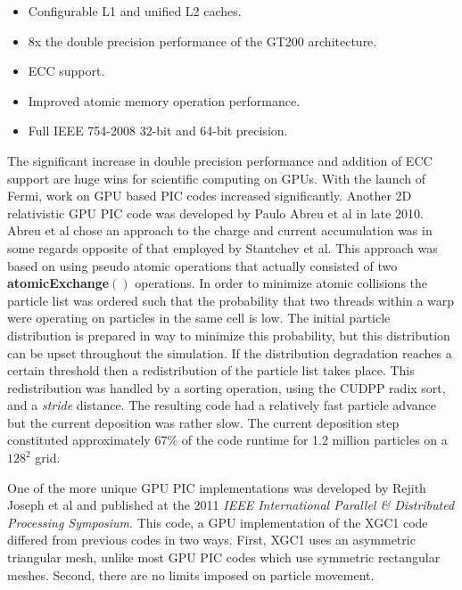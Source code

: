 \begin{itemize}
\singlespacing
\item Configurable L1 and unified L2 caches.
\item 8x the double precision performance of the GT200 architecture. 
\item ECC support. 
\item Improved atomic memory operation performance.
\item Full IEEE 754-2008 32-bit and 64-bit precision. 
\end{itemize}

The significant increase in double precision performance and addition of ECC support are huge wins for scientific computing on GPUs. With the launch of Fermi, work on GPU based PIC codes increased significantly. Another 2D relativistic GPU PIC code was developed by Paulo Abreu et al in late 2010. Abreu et al chose an approach to the charge and current accumulation was in some regards opposite of that employed by Stantchev et al. This approach was based on using pseudo atomic operations that actually consisted of two \textbf{atomicExchange}$()$ operations. In order to minimize atomic collisions the particle list was ordered such that the probability that two threads within a warp were operating on particles in the same cell is low. The initial particle distribution is prepared in way to minimize this probability, but this distribution can be upset throughout the simulation. If the distribution degradation reaches a certain threshold then a redistribution of the particle list takes place. This redistribution was handled by a sorting operation, using the CUDPP radix sort, and a \emph{stride} distance. The resulting code had a relatively fast particle advance but the current deposition was rather slow. The current deposition step constituted approximately 67\% of the code runtime for 1.2 million particles on a $128^2$ grid.\cite{Abreu2011}

One of the more unique GPU PIC implementations was developed by Rejith Joseph et al and published at the 2011 \emph{IEEE International Parallel \& Distributed Processing Symposium}. 
This code, a GPU implementation of the XGC1 code differed from previous codes in two ways. 
First, XGC1 uses an asymmetric triangular mesh, unlike most GPU PIC codes which use symmetric rectangular meshes. Second, there are no limits imposed on particle movement. 

